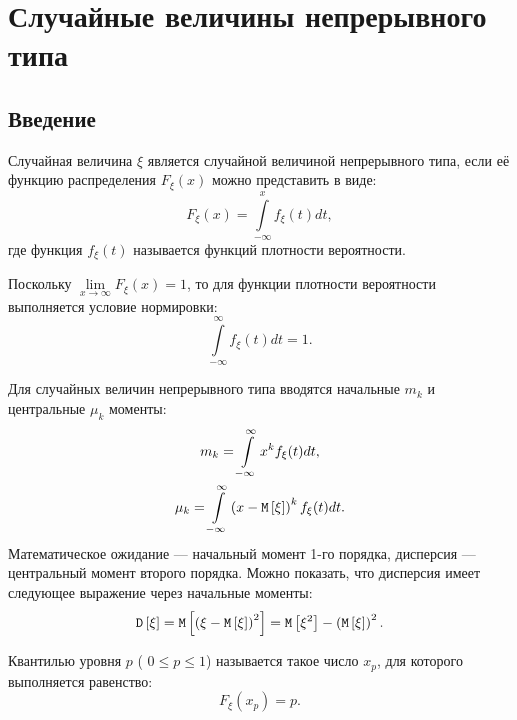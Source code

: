 \chapter{Случайные величины непрерывного типа}

\section*{Введение}

Случайная величина $\xi$ является случайной величиной непрерывного типа, если её функцию распределения $F_\xi(x)$ можно представить в виде:
\begin{equation}
    F_{\xi}(x) = \int \limits_{-\infty}^x f_\xi(t) dt ,
\end{equation}
где функция $f_\xi(t)$ называется функций плотности вероятности.

Поскольку $\lim \limits_{x \rightarrow \infty} F_\xi(x) = 1$, то для функции плотности вероятности выполняется условие нормировки:
\begin{equation}
    \int \limits_{-\infty}^\infty f_\xi(t) dt = 1 .
\end{equation}

Для случайных величин непрерывного типа вводятся начальные $m_k$ и центральные $\mu_k$ моменты:
\begin{gather}
    m_k = \int \limits_{-\infty}^\infty x^k f_\xi(t) dt, \\
    \mu_k = \int \limits_{-\infty}^\infty \left ( x - \mathtt{M} \left [ \xi \right ] \right )^k f_\xi(t) dt.
\end{gather}
Математическое ожидание --- начальный момент 1-го порядка, дисперсия --- центральный момент второго порядка. Можно показать, что дисперсия имеет следующее выражение через
начальные моменты:
\begin{equation}
    \mathtt{D} \left [ \xi \right ]
    = \mathtt{M} \left [ \left ( \xi - \mathtt{M} \left [ \xi \right ] \right )^2 \right ]
    = \mathtt{M} \left [ \xi^2 \right ] - \left ( \mathtt{M} \left [ \xi \right ]\right )^2 .
\end{equation}

Квантилью уровня $p$ ( $0 \le p \le 1$) называется такое число $x_p$, для которого выполняется равенство:
\begin{equation}
    F_{\xi}(x_p) = p .
\end{equation}

